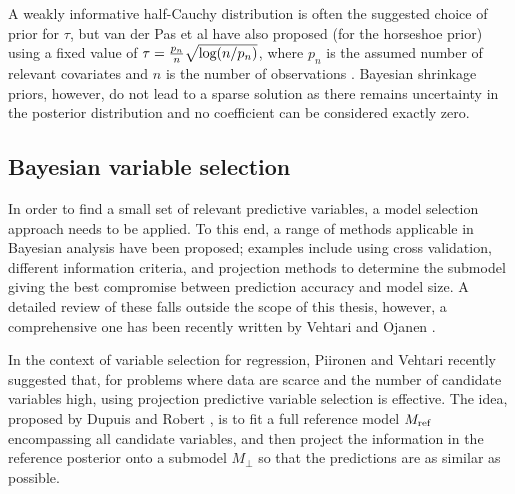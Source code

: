 A weakly
informative half-Cauchy distribution is often the suggested choice of prior
for $\tau$, but van der Pas et al have also proposed (for the horseshoe prior)
using a fixed value of $\tau = \frac{p_n}{n}\sqrt{\textup{log}(n/p_n)}$,
where $p_n$ is the assumed number of relevant covariates and $n$ is the number
of observations \citep{vanderpas2014}. Bayesian shrinkage priors, however, do
not lead to a sparse solution as there remains uncertainty in the posterior
distribution and no coefficient can be considered exactly zero.




\subsection{Bayesian variable selection}\label{sec:bayes-variable-selection}

In order to find a small set of relevant predictive variables, a model
selection approach needs to be applied. To this end, a range of methods
applicable in Bayesian analysis have been proposed; examples include using
cross validation, different information criteria, and projection
methods to determine the submodel giving the best compromise between
prediction accuracy and model size. A detailed review of these falls outside
the scope of this thesis, however, a comprehensive one has been recently
written by Vehtari and Ojanen \citep{Vehtari2012}.

In the context of variable selection for regression,
Piironen and Vehtari \citep{Piironen2016} recently suggested that, for problems where data
are scarce and the number of candidate variables high, using projection predictive
variable selection is effective. The idea, proposed by
Dupuis and Robert \citep{Dupuis2003}, is to fit a full reference model $M_{\textup{ref}}$
encompassing all candidate variables,
and then project the information in the reference posterior onto a submodel $M_\perp$
so that the predictions are as similar as possible.


